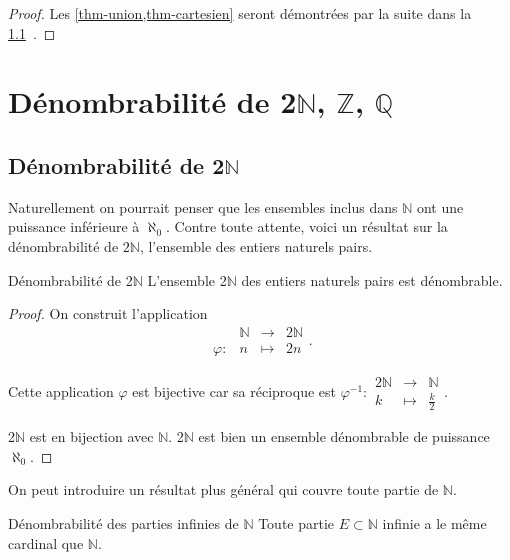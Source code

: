 \documentclass[a4paper,french,final]{memoir}
\begin{document}
\begin{proof}
	Les  \cref{thm-union,thm-cartesien} seront démontrées par la suite dans la \cref{sec-denombrabilite_usuelle}~.
	
\end{proof}




\chapter{\texorpdfstring{Dénombrabilité de 2$\mathbb{N}$, $\mathbb{Z}$, $\mathbb{Q}$}{Dénombrabilité de Q}} 
\section{ \texorpdfstring{Dénombrabilité de 2$\mathbb{N}$}{}}
\label{sec-denombrabilite_usuelle}
Naturellement on pourrait penser que les ensembles inclus dans $\mathbb{N}$ ont une puissance inférieure à $\aleph_0$. Contre toute attente, voici un résultat sur la dénombrabilité de  $2\mathbb{N}$, l'ensemble des entiers naturels pairs.

\begin{theoremb}{Dénombrabilité de 2$\mathbb{N}$}{}
	L'ensemble 2$\mathbb{N}$ des entiers naturels pairs est dénombrable. 
\end{theoremb}

\begin{proof}
	On construit l'application \[ \begin{array}{cccc}
	\ & \mathbb{N}& \to& 2\mathbb{N} \\
	\varphi : & n & \mapsto & 2n
	\end{array}.\]
	
	Cette application $\varphi $ est bijective car sa réciproque est $ \varphi^{-1} : \begin{array}{ccc}
	2\mathbb{N} & \to & \mathbb{N}\\
	k & \mapsto & \frac{k}{2}
	\end{array}$. 
	
	2$\mathbb{N}$ est en bijection avec $\mathbb{N}$. 2$\mathbb{N}$ est bien un ensemble dénombrable de puissance $\aleph_0$. 
\end{proof}

On peut introduire un résultat plus général qui couvre toute partie de $\mathbb{N}$. 

\begin{theoremb}{Dénombrabilité des parties infinies de $\mathbb{N}$}{}
	Toute partie $E \subset \mathbb{N}$ infinie a le même cardinal que $\mathbb{N}$. 
\end{theoremb}
\end{document}
